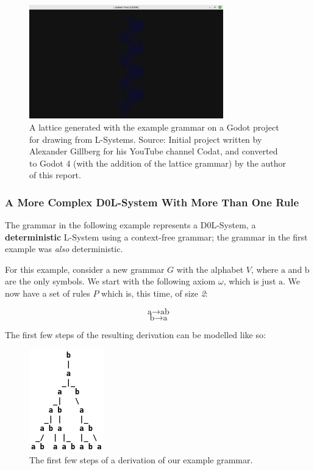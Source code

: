 \begin{figure}[H]
    \centering
    \includegraphics[width=0.75\textwidth]{Images/gd4lattice.png}
    \caption{A lattice generated with the example grammar on a Godot project for drawing from L-Systems. Source: Initial project written by Alexander Gillberg for his YouTube channel Codat\cite{codatGD3LSystemYT}\cite{codatGD3LSystemGH}, and converted to Godot 4 (with the addition of the lattice grammar) by the author of this report.\cite{codatGD4LSystemGH}}
    \label{fig:lattice2}
\end{figure}

\subsubsection{A More Complex D0L-System With More Than One Rule} \label{lcomplex}

The grammar in the following example represents a D0L-System\cite{lsystemintro}, a \textbf{deterministic} L-System using a context-free grammar; the grammar in the first example was \textit{also} deterministic.

\newcommand{\A}{\mbox{a}}
\newcommand{\B}{\mbox{b}}

For this example, consider a new grammar $G$ with the alphabet $V$, where $\A$ and $\B$ are the only symbols. We start with the following axiom $\omega$, which is just $\A$. We now have a set of rules $P$ which is, this time, of size \textit{2}:

$$ \A \rightarrow \A\B $$
$$ \B \rightarrow \A $$

The first few steps of the resulting derivation can be modelled like so:

\begin{figure}[H]
    \centering
    \includegraphics[scale=0.5]{Images/derivationtree.png}
    \caption{The first few steps of a derivation of our example grammar.\cite{lsystemintro}}
    \label{fig:derivationtree}
\end{figure}

